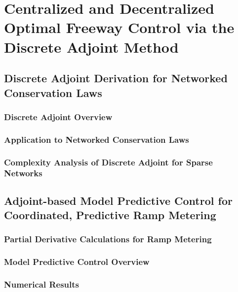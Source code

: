 \chapter{Centralized and Decentralized Optimal Freeway Control via the Discrete Adjoint Method}

\section{Discrete Adjoint Derivation for Networked Conservation Laws}

\subsection{Discrete Adjoint Overview}

\subsection{Application to Networked Conservation Laws}

\subsection{Complexity Analysis of Discrete Adjoint for Sparse Networks}

\section{Adjoint-based Model Predictive Control for Coordinated, Predictive Ramp Metering}

\subsection{Partial Derivative Calculations for Ramp Metering}

\subsection{Model Predictive Control Overview}

\subsection{Numerical Results}
\label{sec:numerical-results-adjoint}